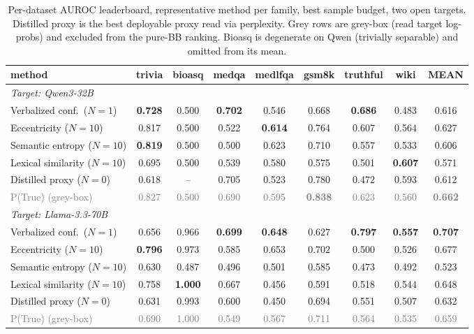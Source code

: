 \documentclass[11pt]{article}
\newcommand{\best}[1]{\textbf{#1}}
\newcommand{\grey}[1]{\textcolor{gray}{#1}}
\begin{document}
\begin{table}[t]\centering\small
\setlength{\tabcolsep}{4pt}
\begin{tabular}{l ccccccc c}
\toprule
method & trivia & bioasq & medqa & medlfqa & gsm8k & truthful & wiki & \best{MEAN}\\
\midrule
\multicolumn{9}{l}{\emph{Target: Qwen3-32B}}\\
Verbalized conf.\ ($N{=}1$)       & \best{0.728} & 0.500 & \best{0.702} & 0.546 & 0.668 & \best{0.686} & 0.483 & 0.616\\
Eccentricity ($N{=}10$)           & 0.817 & 0.500 & 0.522 & \best{0.614} & 0.764 & 0.607 & 0.564 & 0.627\\
Semantic entropy ($N{=}10$)       & \best{0.819} & 0.500 & 0.500 & 0.623 & 0.710 & 0.557 & 0.533 & 0.606\\
Lexical similarity ($N{=}10$)     & 0.695 & 0.500 & 0.539 & 0.580 & 0.575 & 0.501 & \best{0.607} & 0.571\\
Distilled proxy ($N{=}0$)         & 0.618 & --    & 0.705 & 0.523 & 0.780 & 0.472 & 0.593 & 0.612\\
\grey{P(True) (grey-box)}         & \grey{0.827} & \grey{0.500} & \grey{0.690} & \grey{0.595} & \grey{\best{0.838}} & \grey{0.623} & \grey{0.560} & \grey{\best{0.662}}\\
\midrule
\multicolumn{9}{l}{\emph{Target: Llama-3.3-70B}}\\
Verbalized conf.\ ($N{=}1$)       & 0.656 & 0.966 & \best{0.699} & \best{0.648} & 0.627 & \best{0.797} & \best{0.557} & \best{0.707}\\
Eccentricity ($N{=}10$)           & \best{0.796} & 0.973 & 0.585 & 0.653 & 0.702 & 0.500 & 0.526 & 0.677\\
Semantic entropy ($N{=}10$)       & 0.630 & 0.487 & 0.496 & 0.501 & 0.585 & 0.473 & 0.492 & 0.523\\
Lexical similarity ($N{=}10$)     & 0.758 & \best{1.000} & 0.667 & 0.456 & 0.591 & 0.518 & 0.544 & 0.648\\
Distilled proxy ($N{=}0$)         & 0.631 & 0.993 & 0.600 & 0.450 & 0.694 & 0.551 & 0.507 & 0.632\\
\grey{P(True) (grey-box)}         & \grey{0.690} & \grey{1.000} & \grey{0.549} & \grey{0.567} & \grey{0.711} & \grey{0.564} & \grey{0.535} & \grey{0.659}\\
\bottomrule
\end{tabular}
\caption{Per-dataset AUROC leaderboard, representative method per family, best sample
budget, two open targets. Distilled proxy is the best deployable proxy read via
perplexity. Grey rows are grey-box (read target log-probs) and excluded from the pure-BB
ranking. Bioasq is degenerate on Qwen (trivially separable) and omitted from its mean.}
\label{tab:leaderboard}
\end{table}
\end{document}
